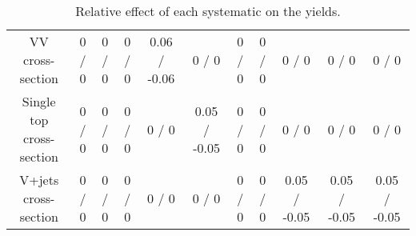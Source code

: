 \begin{table}[htbp]
\begin{center}
\begin{tabular}{|c|c|c|c|c|c|c|c|c|c|c|}
  VV cross-section & 0 / 0 & 0 / 0 & 0 / 0 & 0.06 / -0.06 & 0 / 0 & 0 / 0 & 0 / 0 & 0 / 0 & 0 / 0 & 0 / 0 \\ 
  Single top cross-section & 0 / 0 & 0 / 0 & 0 / 0 & 0 / 0 & 0.05 / -0.05 & 0 / 0 & 0 / 0 & 0 / 0 & 0 / 0 & 0 / 0 \\ 
  V+jets cross-section & 0 / 0 & 0 / 0 & 0 / 0 & 0 / 0 & 0 / 0 & 0 / 0 & 0 / 0 & 0.05 / -0.05 & 0.05 / -0.05 & 0.05 / -0.05 \\ 
\hline 
\end{tabular} 
\caption{Relative effect of each systematic on the yields.} 
\end{center} 
\end{table} 
